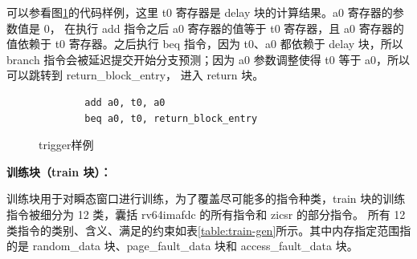 可以参看图\ref{code:trigger-example}的代码样例，这里 t0 寄存器是 delay 块的计算结果。a0 寄存器的参数值是 0，
在执行 add 指令之后 a0 寄存器的值等于 t0 寄存器，且 a0 寄存器的值依赖于 t0 寄存器。之后执行 beq 指令，因为 t0、a0 都依赖于
delay 块，所以 branch 指令会被延迟提交开始分支预测；因为 a0 参数调整使得 t0 等于 a0，所以可以跳转到 return\_block\_entry，
进入 return 块。\par

\begin{figure}[htbp]
    \centering
    \begin{verbatim}
        add a0, t0, a0
        beq a0, t0, return_block_entry
    \end{verbatim}
    \caption{trigger样例}
    \label{code:trigger-example}
\end{figure}

\textbf{训练块（train 块）：}\par
训练块用于对瞬态窗口进行训练，为了覆盖尽可能多的指令种类，train 块的训练指令被细分为 12 类，囊括 rv64imafdc 的所有指令和 zicsr 的部分指令。
所有 12 类指令的类别、含义、满足的约束如表\ref{table:train-gen}所示。其中内存指定范围指的是 random\_data 块、page\_fault\_data 块和 
access\_fault\_data 块。\par

